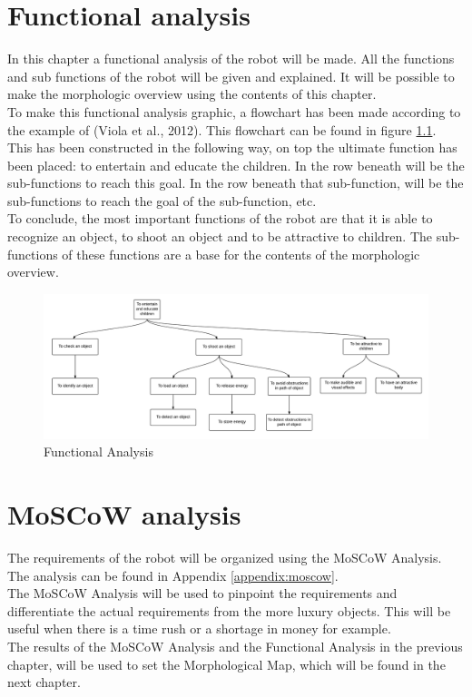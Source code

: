 \documentclass[11pt,twoside,a4paper]{report}
\begin{document}
\chapter{Functional analysis}
In this chapter a functional analysis of the robot will be made. All the functions and sub functions of the robot will be given and explained. It will be possible to make the morphologic overview using the contents of this chapter. \\
To make this functional analysis graphic, a flowchart has been made according to the example of (Viola et al., 2012). This flowchart can be found in figure \ref{fig:FuncAnal}.\\
This has been constructed in the following way, on top the ultimate function has been placed: to entertain and educate the children. In the row beneath will be the sub-functions to reach this goal. In the row beneath that sub-function, will be the sub-functions to reach the goal of the sub-function, etc. \\
To conclude, the most important functions of the robot are that it is able to recognize an object, to shoot an object and to be attractive to children. The sub-functions of these functions are a base for the contents of the morphologic overview. 

\begin{figure}[h]
\begin{center}
\includegraphics[width = 17cm]{Images/FunctionalAnalysis.png}
\end{center}
\caption{Functional Analysis}
\label{fig:FuncAnal}
\end{figure}

\chapter{MoSCoW analysis}
The requirements of the robot will be organized using the MoSCoW Analysis. The analysis can be found in Appendix \ref{appendix:moscow}. \\
The MoSCoW Analysis will be used to pinpoint the requirements and differentiate the actual requirements from the more luxury objects. This will be useful when there is a time rush or a shortage in money for example. \\
The results of the MoSCoW Analysis and the Functional Analysis in the previous chapter, will be used to set the Morphological Map, which will be found in the next chapter.
\end{document}
